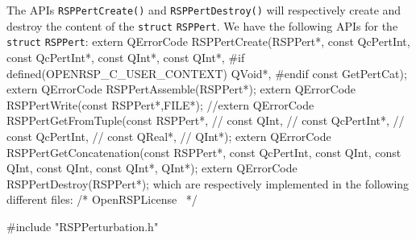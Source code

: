 The APIs {\tt{}RSPPertCreate()} and {\tt{}RSPPertDestroy()} will respectively create
and destroy the content of the {\tt{}struct} {\tt{}RSPPert}. We have the following
APIs for the {\tt{}struct} {\tt{}RSPPert}:
\nwenddocs{}\endmoddef
extern QErrorCode RSPPertCreate(RSPPert*,
                                const QcPertInt,
                                const QcPertInt*,
                                const QInt*,
                                const QInt*,
#if defined(OPENRSP_C_USER_CONTEXT)
                                QVoid*,
#endif
                                const GetPertCat);
extern QErrorCode RSPPertAssemble(RSPPert*);
extern QErrorCode RSPPertWrite(const RSPPert*,FILE*);
//extern QErrorCode RSPPertGetFromTuple(const RSPPert*,
//                                      const QInt,
//                                      const QcPertInt*,
//                                      const QcPertInt,
//                                      const QReal*,
//                                      QInt*);
extern QErrorCode RSPPertGetConcatenation(const RSPPert*,
                                          const QcPertInt,
                                          const QInt,
                                          const QInt,
                                          const QInt,
                                          const QInt*,
                                          QInt*);
extern QErrorCode RSPPertDestroy(RSPPert*);
\nwendcode{}which are respectively implemented in the following different files:
\nwenddocs{}\endmoddef
/*
  \LA{}OpenRSPLicense~{\nwtagstyle{}}\RA{}
*/

#include "RSPPerturbation.h"

